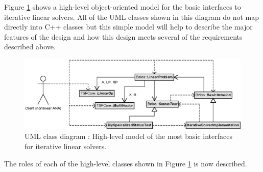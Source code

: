 \documentclass[pdf,ps2pdf,11pt]{SANDreport}
\begin{document}
Figure {}\ref{belos:fig:BelosInterfacesSimple} shows a high-level
object-oriented model for the basic interfaces to iterative linear
solvers.  All of the UML classes shown in this diagram do not map
directly into C++ classes but this simple model will help to describe
the major features of the design and how this design meets several of
the requirements described above.

{\bsinglespace
\begin{figure}[t]
\begin{center}
\includegraphics*[scale=0.85]{BelosInterfacesSimple}
\end{center}
\caption{
\label{belos:fig:BelosInterfacesSimple}
UML class diagram : High-level model of
the most basic interfaces for iterative linear solvers.}
\end{figure}
\esinglespace}

The roles of each of the high-level classes shown in Figure
{}\ref{belos:fig:BelosInterfacesSimple} is now described.
\end{document}
